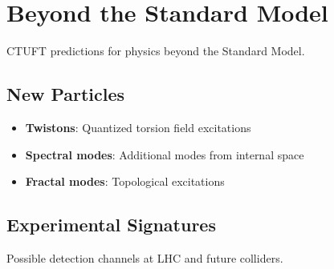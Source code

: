 \section{Beyond the Standard Model}
\label{sec:bsm}

CTUFT predictions for physics beyond the Standard Model.

\subsection{New Particles}

\begin{itemize}
    \item \textbf{Twistons}: Quantized torsion field excitations
    \item \textbf{Spectral modes}: Additional modes from internal space
    \item \textbf{Fractal modes}: Topological excitations
\end{itemize}

\subsection{Experimental Signatures}

Possible detection channels at LHC and future colliders.
